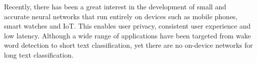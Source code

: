 Recently, there has been a great interest in the development of small and accurate neural networks that run entirely on devices such as mobile phones, smart watches and IoT. This enables user privacy, consistent user experience and low latency. Although a wide range of applications have been targeted from wake word detection to short text classification, yet there are no on-device networks for long text classification.